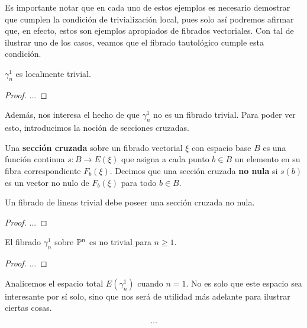 Es importante notar que en cada uno de estos ejemplos es necesario demostrar que cumplen la condición de trivialización local, pues solo así podremos afirmar que, en efecto, estos son ejemplos apropiados de fibrados vectoriales. Con tal de ilustrar uno de los casos, veamos que el fibrado tautológico cumple esta condición.

\begin{lemma}
	$\gamma_{n}^{1}$ es localmente trivial.
\end{lemma}
\begin{proof}
	...
\end{proof}

Además, nos interesa el hecho de que $\gamma_{n}^{1}$ no es un fibrado trivial. Para poder ver esto, introducimos la noción de secciones cruzadas.

\begin{definition}
	Una \textbf{sección cruzada} sobre un fibrado vectorial $\xi$ con espacio base $B$ es una función continua $s \colon B \to E(\xi)$ que asigna a cada punto $b \in B$ un elemento en su fibra correspondiente $F_{b}(\xi)$. Decimos que una sección cruzada \textbf{no nula} si $s(b)$ es un vector no nulo de $F_{b}(\xi)$ para todo $b \in B$.
\end{definition}



\begin{lemma}
	Un fibrado de lineas trivial debe poseer una sección cruzada no nula.
\end{lemma}
\begin{proof}
	...
\end{proof}

\begin{lemma}
	El fibrado $\gamma_{n}^{1}$ sobre $\P^{n}$ es no trivial para $n \geq 1$.
\end{lemma}
\begin{proof}
	...
\end{proof}

Analicemos el espacio total $E(\gamma_{n}^{1})$ cuando $n = 1$. No es solo que este espacio sea interesante por sí solo, sino que nos será de utilidad más adelante para ilustrar ciertas cosas.

\[ \ldots \]

